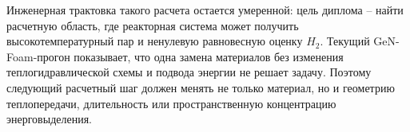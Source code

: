 Инженерная трактовка такого расчета остается умеренной: цель диплома -- найти расчетную область, где реакторная система может получить высокотемпературный пар и ненулевую равновесную оценку \(H_2\). Текущий GeN-Foam-прогон показывает, что одна замена материалов без изменения теплогидравлической схемы и подвода энергии не решает задачу. Поэтому следующий расчетный шаг должен менять не только материал, но и геометрию теплопередачи, длительность или пространственную концентрацию энерговыделения.

